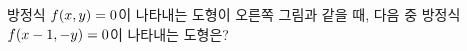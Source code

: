 \noindent\begin{minipage}[t]{0.58\linewidth}\vspace{0pt}\raggedright 방정식 $f(x{,}\mkern3mu\mathopen{}y)=0$이 나타내는 도형이 오른쪽 그림과 같을 때, 다음 중 방정식 $f(x-1{,}\mkern3mu\mathopen{}-y)=0$이 나타내는 도형은?\end{minipage}\hfill\begin{minipage}[t]{0.4\linewidth}\vspace{0pt}\centering \resizebox{\ifdim\width>\linewidth\linewidth\else\width\fi}{!}{}\end{minipage}\par
\begin{choicesii}{}{}{}{}{}\end{choicesii}
